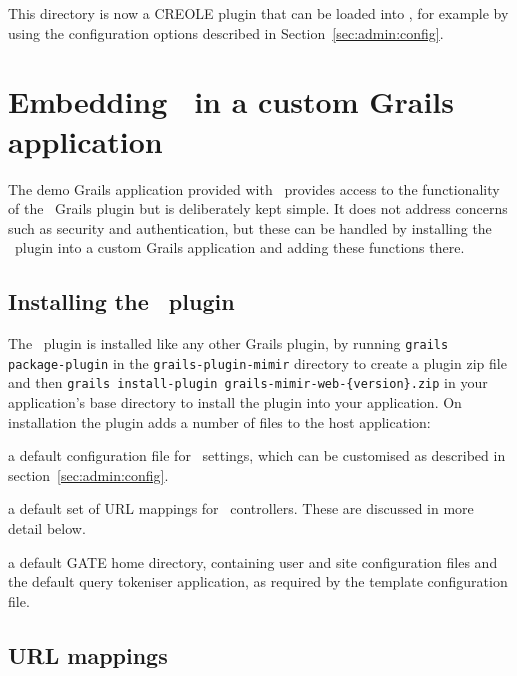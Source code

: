 This directory is now a CREOLE plugin that can be loaded into \Mimir, for
example by using the configuration options described in
Section~\ref{sec:admin:config}.

\section{Embedding \Mimir\ in a custom Grails application}
\label{sec:extend:customapp}

The demo Grails application provided with \Mimir\ provides access to the
functionality of the \Mimir\ Grails plugin but is deliberately kept simple.  It
does not address concerns such as security and authentication, but these can be
handled by installing the \Mimir\ plugin into a custom Grails application and
adding these functions there.

\subsection{Installing the \Mimir\ plugin}

The \Mimir\ plugin is installed like any other Grails plugin, by running
{\tt grails package-plugin} in the {\tt grails-plugin-mimir} directory to
create a plugin zip file and then
{\tt grails install-plugin grails-mimir-web-\{version\}.zip} in your
application's base directory to install the plugin into your application.  On
installation the plugin adds a number of files to the host application:

\bde
\item[grails-app/conf/MimirConfig.groovy] a default configuration file for
  \Mimir\ settings, which can be customised as described in
  section~\ref{sec:admin:config}.
\item[grails-app/conf/MimirUrlMappings.groovy] a default set of URL mappings
  for \Mimir\ controllers.  These are discussed in more detail below.
\item[web-app/WEB-INF/gate-home] a default GATE home directory, containing user
  and site configuration files and the default query tokeniser application, as
  required by the template configuration file.
\ede

\subsection{URL mappings}

